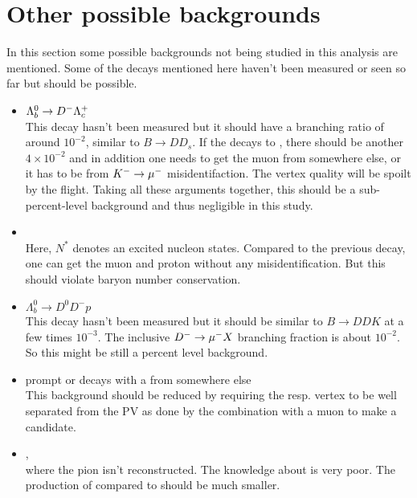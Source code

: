 \section{Other possible backgrounds}
In this section some possible backgrounds not being studied in this analysis are mentioned.
Some of the decays mentioned here haven't been measured or seen so far but should be possible.
\begin{itemize}
    \item $\Lambda_b^0 \rightarrow {\ensuremath{{D}^-}} {\ensuremath{{\Lambda}^+_{c}}}$ \\
          This decay hasn't been measured but it should have a branching ratio of around $10^{-2}$, similar to $B \rightarrow D D_s$.
          If the \Lc decays to \pKpi, there should be another $4 \times 10^{-2}$ and in addition one needs to get the muon from somewhere else, or it has to be from ${{K}^-} \rightarrow {\ensuremath{\mu^-}}$ misidentifaction. 
          The vertex quality will be spoilt by the \Lc flight.
          Taking all these arguments together, this should be a sub-percent-level background and thus negligible in this study.
    \item {} \\
          Here, $N^*$ denotes an excited nucleon states.
          Compared to the previous decay, one can get the muon and proton without any misidentification.
          But this should violate baryon number conservation.
    \item $\Lambda_b^0 \rightarrow D^0 D^- p$ \\
          This decay hasn't been measured but it should be similar to $B \rightarrow DDK$ at a few times $10^{-3}$.
          The inclusive ${{D}^-} \rightarrow {\ensuremath{\mu^-}} X$ branching fraction is about $10^{-2}$.
          So this might be still a percent level background.
    \item prompt \LcResI or \LcResII decays with a \mun from somewhere else \\
          This background should be reduced by requiring the \LcResI resp. \LcResII vertex to be well separated from the PV as done by the combination with a muon to make a \Lb candidate.
    \item \decay{\SigmabRes}{\Lb \pi}, \\ 
          where the pion isn't reconstructed.
          The knowledge about \SigmabRes is very poor.
          The production of \SigmabRes compared to \Lb should be much smaller.
\end{itemize}

